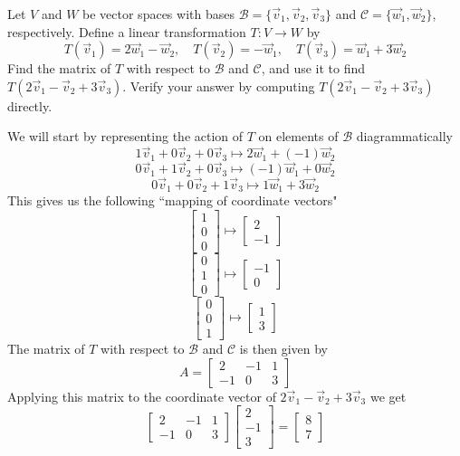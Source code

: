 \documentclass{ximera}
\begin{document}
\begin{example}\label{ex:transmatrix1}
Let $V$ and $W$ be vector spaces with bases $\mathcal{B}=\{\vec{v}_1, \vec{v}_2, \vec{v}_3\}$ and $\mathcal{C}=\{\vec{w}_1, \vec{w}_2\}$, respectively.  Define a linear transformation $T:V\rightarrow W$ by $$T(\vec{v}_1)=2\vec{w}_1-\vec{w}_2,\quad T(\vec{v}_2)=-\vec{w}_1,\quad T(\vec{v}_3)=\vec{w}_1+3\vec{w}_2$$
Find the matrix of $T$ with respect to $\mathcal{B}$ and $\mathcal{C}$, and use it to find $T(2\vec{v}_1-\vec{v}_2+3\vec{v}_3)$.  Verify your answer by computing $T(2\vec{v}_1-\vec{v}_2+3\vec{v}_3)$ directly.

\begin{explanation}
We will start by representing the action of $T$ on elements of $\mathcal{B}$ diagrammatically
$$1\vec{v}_1+0\vec{v}_2+0\vec{v}_3\mapsto 2\vec{w}_1+(-1)\vec{w}_2$$
$$0\vec{v}_1+1\vec{v}_2+0\vec{v}_3\mapsto (-1)\vec{w}_1+0\vec{w}_2$$
$$0\vec{v}_1+0\vec{v}_2+1\vec{v}_3\mapsto 1\vec{w}_1+3\vec{w}_2$$
This gives us the following ``mapping of coordinate vectors"
$$\begin{bmatrix}1\\0\\0\end{bmatrix}\mapsto \begin{bmatrix}2\\-1\end{bmatrix}$$
$$\begin{bmatrix}0\\1\\0\end{bmatrix}\mapsto \begin{bmatrix}-1\\0\end{bmatrix}$$
$$\begin{bmatrix}0\\0\\1\end{bmatrix}\mapsto \begin{bmatrix}1\\3\end{bmatrix}$$
The matrix of $T$ with respect to $\mathcal{B}$ and $\mathcal{C}$ is then given by
$$A=\begin{bmatrix}2&-1&1\\-1&0&3\end{bmatrix}$$
Applying this matrix to the coordinate vector of $2\vec{v}_1-\vec{v}_2+3\vec{v}_3$ we get
$$\begin{bmatrix}2&-1&1\\-1&0&3\end{bmatrix}\begin{bmatrix}2\\-1\\3\end{bmatrix}=\begin{bmatrix}8\\7\end{bmatrix}$$


\end{explanation}
\end{example}
\end{document}
